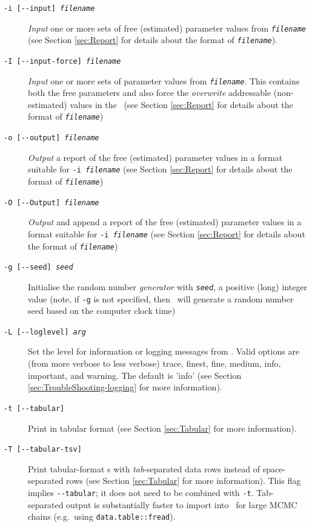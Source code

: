 \begin{description}
\item [\texttt{-i [-{}-input] \emph{filename}}] \emph{Input} one or more sets of free (estimated) parameter values from \texttt{\emph{filename}} (see Section \ref{sec:Report} for details about the format of \texttt{\emph{filename}}).
\item [\texttt{-I [-{}-input-force] \emph{filename}}] \emph{Input} one or more sets of parameter values from \texttt{\emph{filename}}. This contains both the free parameters and also force the \emph{overwrite} addressable (non-estimated) values in the \config\ (see Section \ref{sec:Report} for details about the format of \texttt{\emph{filename}})
\item [\texttt{-o [-{}-output] \emph{filename}}] \emph{Output} a report of the free (estimated) parameter values in a format suitable for \texttt{-i \emph{filename}} (see Section \ref{sec:Report} for details about the format of \texttt{\emph{filename}})
\item [\texttt{-O [-{}-Output] \emph{filename}}] \emph{Output} and append a report of the free (estimated) parameter values in a format suitable for \texttt{-i \emph{filename}} (see Section \ref{sec:Report} for details about the format of \texttt{\emph{filename}})
\item [\texttt{-g [-{}-seed] \emph{seed}}] Initialise the random number \emph{generator} with \texttt{\emph{seed}}, a positive (long) integer value (note, if \texttt{-g} is not specified, then \CNAME\ will  generate a random number seed based on the computer clock time)
\item [\texttt{-L [-{}-loglevel] \emph{arg}}] Set the level for information or logging messages from \CNAME. Valid options are (from more verbose to less verbose) trace, finest, fine, medium, info, important, and warning. The default is 'info' (see Section \ref{sec:TroubleShooting-logging} for more information).
\item [\texttt{-t [-{}-tabular]}] Print  in tabular format (see Section \ref{sec:Tabular} for more information).
\item [\texttt{-T [-{}-tabular-tsv]}] Print tabular-format s with \emph{tab}-separated data rows instead of space-separated rows (see Section \ref{sec:Tabular} for more information). This flag implies \texttt{-{}-tabular}; it does not need to be combined with \texttt{-t}. Tab-separated output is substantially faster to import into \R\ for large MCMC chains (e.g.~using \texttt{data.table::fread}).

\end{description}
